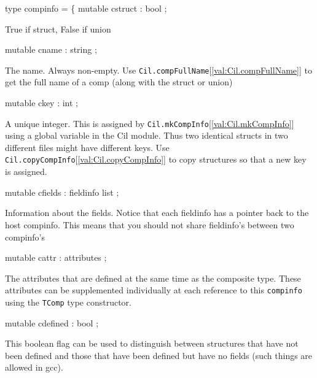 \documentclass[11pt]{article}
\begin{document}
\label{type:Cil.compinfo}\begin{ocamldoccode}
type compinfo = \{
  mutable cstruct : bool ;
\end{ocamldoccode}
\begin{ocamldoccomment}
True if struct, False if union
\end{ocamldoccomment}
\begin{ocamldoccode}
  mutable cname : string ;
\end{ocamldoccode}
\begin{ocamldoccomment}
The name. Always non-empty. Use {\tt{Cil.compFullName}}[\ref{val:Cil.compFullName}] to get the full 
 name of a comp (along with the struct or union)
\end{ocamldoccomment}
\begin{ocamldoccode}
  mutable ckey : int ;
\end{ocamldoccode}
\begin{ocamldoccomment}
A unique integer. This is assigned by {\tt{Cil.mkCompInfo}}[\ref{val:Cil.mkCompInfo}] using a 
 global variable in the Cil module. Thus two identical structs in two 
 different files might have different keys. Use {\tt{Cil.copyCompInfo}}[\ref{val:Cil.copyCompInfo}] to 
 copy structures so that a new key is assigned.
\end{ocamldoccomment}
\begin{ocamldoccode}
  mutable cfields : fieldinfo list ;
\end{ocamldoccode}
\begin{ocamldoccomment}
Information about the fields. Notice that each fieldinfo has a 
 pointer back to the host compinfo. This means that you should not 
 share fieldinfo's between two compinfo's
\end{ocamldoccomment}
\begin{ocamldoccode}
  mutable cattr : attributes ;
\end{ocamldoccode}
\begin{ocamldoccomment}
The attributes that are defined at the same time as the composite 
 type. These attributes can be supplemented individually at each 
 reference to this {\tt{compinfo}} using the {\tt{TComp}} type constructor.
\end{ocamldoccomment}
\begin{ocamldoccode}
  mutable cdefined : bool ;
\end{ocamldoccode}
\begin{ocamldoccomment}
This boolean flag can be used to distinguish between structures
     that have not been defined and those that have been defined but have
     no fields (such things are allowed in gcc).
\end{ocamldoccomment}
\end{document}

